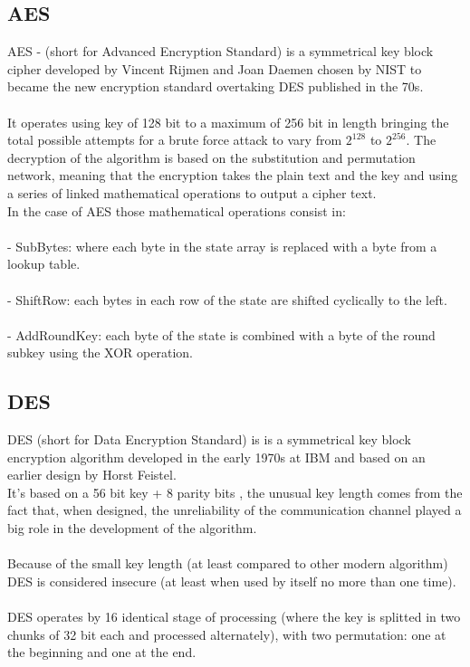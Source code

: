 \documentclass{article}
\begin{document}
	\subsection{AES}
	AES - (short for Advanced Encryption Standard) is a symmetrical key block cipher developed by 		Vincent Rijmen and Joan Daemen chosen by NIST to became the new encryption standard 		overtaking DES published in the 70s.\\
	\\It operates using key of 128 bit to a maximum of 256 bit in length bringing the total possible 		attempts for a brute force attack to vary from $2^{128}$ to $2^{256}$.
	The decryption of the algorithm is based on the substitution and permutation network, meaning that 
	the encryption takes the plain text and the key and using a series of linked mathematical operations to output a cipher text.\\
	 In the case of AES those mathematical operations consist in:\\
	 \\- SubBytes: where each byte in the state array is replaced with a byte from a lookup table.\\
 \\- ShiftRow: each bytes in each row of the state are shifted cyclically to the left. \\
	 \\- AddRoundKey: each byte of the state is combined with a byte of the round subkey using the XOR operation.\\
	 
	\subsection{DES}
	DES (short for Data Encryption Standard) is is a symmetrical key block encryption algorithm developed in the early 1970s at IBM and based on an earlier design by Horst Feistel. \\It's based on a 56 bit key + 8 parity bits , the 	unusual key length comes from the fact that, when designed, the unreliability of the communication channel played a big role in the development of the algorithm.\\
	\\Because of the small key length (at least compared to other modern algorithm) DES is considered 	insecure (at least when used by itself no more than one time).\\
	\\DES operates by 16 identical stage of processing (where the key is splitted in two chunks of 32 bit each and processed alternately), with two permutation: one at the beginning and one at the end.
\end{document}
